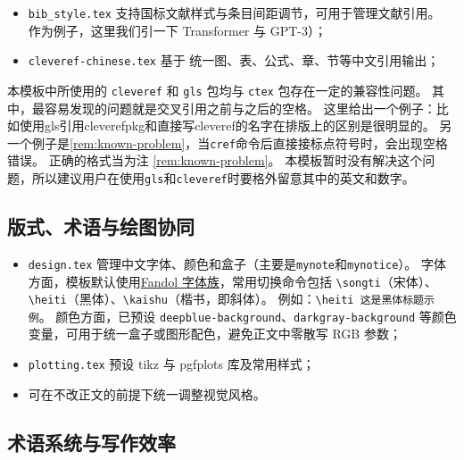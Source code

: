 \begin{itemize}
  \item \texttt{bib\_style.tex} 支持国标文献样式与条目间距调节，可用于管理文献引用。
  作为例子，这里我们引一下 Transformer\cite{DBLP:conf/nips/VaswaniSPUJGKP17} 与 GPT-3\cite{DBLP:conf/nips/BrownMRSKDNSSAA20}）；
  \item \texttt{cleveref-chinese.tex} 基于  统一图、表、公式、章、节等中文引用输出；
\end{itemize}

\begin{remark}[已知问题]\label{rem:known-problem}
  本模板中所使用的 \texttt{cleveref} 和 \texttt{gls} 包均与 \texttt{ctex} 包存在一定的兼容性问题。
  其中，最容易发现的问题就是交叉引用之前与之后的空格。
  这里给出一个例子：比如使用gls引用\gls{cleverefpkg}和直接写cleveref的名字在排版上的区别是很明显的。
  另一个例子是\cref{rem:known-problem}，当\texttt{cref}命令后直接接标点符号时，会出现空格错误。
  正确的格式当为注 \ref{rem:known-problem}。
  本模板暂时没有解决这个问题，所以建议用户在使用\texttt{gls}和\texttt{cleveref}时要格外留意其中的英文和数字。
\end{remark}

\subsection{版式、术语与绘图协同}

\begin{itemize}
  \item \texttt{design.tex} 管理中文字体、颜色和盒子（主要是\texttt{mynote}和\texttt{mynotice}）。
  字体方面，模板默认使用\href{https://ctan.org/tex-archive/fonts/fandol?lang=en}{Fandol 字体族}，常用切换命令包括 \texttt{\textbackslash songti}（宋体）、\texttt{\textbackslash heiti}（{\heiti 黑体}）、\texttt{\textbackslash kaishu}（{\kaishu 楷书}，即斜体）。
  例如：\texttt{{\textbackslash heiti 这是黑体标题示例}}。
  颜色方面，已预设 \texttt{deepblue-background}、\texttt{darkgray-background} 等颜色变量，可用于统一盒子或图形配色，避免正文中零散写 RGB 参数；
  \item \texttt{plotting.tex} 预设 \gls{tikz} 与 \gls{pgfplots} 库及常用样式；
  \item 可在不改正文的前提下统一调整视觉风格。
\end{itemize}

\subsection{术语系统与写作效率}

